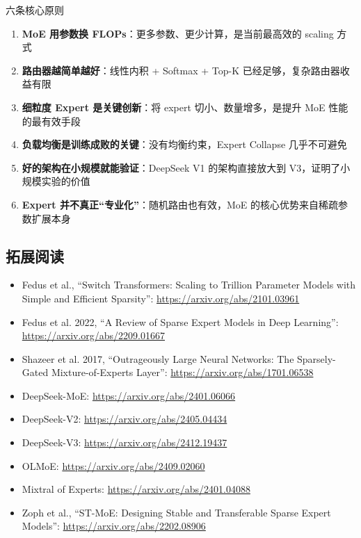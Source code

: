\documentclass[a4paper]{article}
\begin{document}
\begin{importantbox}{六条核心原则}
\begin{enumerate}
    \item \textbf{MoE 用参数换 FLOPs}：更多参数、更少计算，是当前最高效的 scaling 方式
    \item \textbf{路由器越简单越好}：线性内积 + Softmax + Top-K 已经足够，复杂路由器收益有限
    \item \textbf{细粒度 Expert 是关键创新}：将 expert 切小、数量增多，是提升 MoE 性能的最有效手段
    \item \textbf{负载均衡是训练成败的关键}：没有均衡约束，Expert Collapse 几乎不可避免
    \item \textbf{好的架构在小规模就能验证}：DeepSeek V1 的架构直接放大到 V3，证明了小规模实验的价值
    \item \textbf{Expert 并不真正``专业化''}：随机路由也有效，MoE 的核心优势来自稀疏参数扩展本身
\end{enumerate}
\end{importantbox}

\subsection{拓展阅读}

\begin{itemize}
    \item Fedus et al., ``Switch Transformers: Scaling to Trillion Parameter Models with Simple and Efficient Sparsity'': \url{https://arxiv.org/abs/2101.03961}
    \item Fedus et al. 2022, ``A Review of Sparse Expert Models in Deep Learning'': \url{https://arxiv.org/abs/2209.01667}
    \item Shazeer et al. 2017, ``Outrageously Large Neural Networks: The Sparsely-Gated Mixture-of-Experts Layer'': \url{https://arxiv.org/abs/1701.06538}
    \item DeepSeek-MoE: \url{https://arxiv.org/abs/2401.06066}
    \item DeepSeek-V2: \url{https://arxiv.org/abs/2405.04434}
    \item DeepSeek-V3: \url{https://arxiv.org/abs/2412.19437}
    \item OLMoE: \url{https://arxiv.org/abs/2409.02060}
    \item Mixtral of Experts: \url{https://arxiv.org/abs/2401.04088}
    \item Zoph et al., ``ST-MoE: Designing Stable and Transferable Sparse Expert Models'': \url{https://arxiv.org/abs/2202.08906}
\end{itemize}
\end{document}
